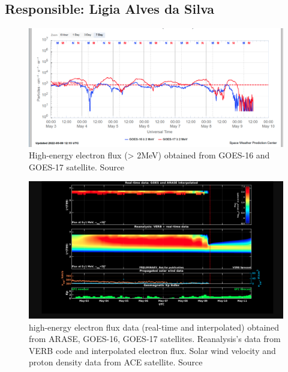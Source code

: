 \documentclass[11pt, oneside]{article}
\begin{document}
 \subsection{Responsible: Ligia Alves da Silva} 
 
\begin{figure}[H]
    
                        \centering
   
                             \includegraphics[width=14cm]{./figures//figureRadBelts_0.png}

                             \caption{ High-energy electron flux (> 2MeV) obtained from GOES-16 and GOES-17 satellite. Source}
                        \end{figure}

                     \begin{figure}[H]
    
                        \centering
   
                             \includegraphics[width=14cm]{./figures//figureRadBelts_1.png}

                             \caption{ high-energy electron flux data (real-time and interpolated) obtained from ARASE, GOES-16, GOES-17 satellites. Reanalysis’s data from VERB code and interpolated electron flux. Solar wind velocity and proton density data from ACE satellite. Source}
                        \end{figure}
\end{document}
